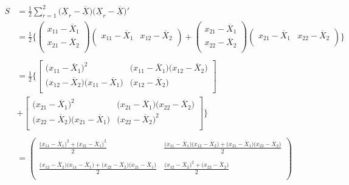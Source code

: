 \documentclass[11pt,a4paper]{article}
\theoremstyle{definition}
\begin{document}
\begin{align*}
S & = \frac{1}{2}\sum^2_{r=1}\big(\underline{X}_r-\underline{\overline{X}}\big)\big(\underline{X}_r-\overline{\underline{X}}\big)'\\
  & = \frac{1}{2}\Bigg\{
\begin{pmatrix}
x_{11}-\overline{X}_1\\ x_{21}-\overline{X}_2\\
\end{pmatrix}  
\begin{pmatrix}
x_{11}-\overline{X}_1 & x_{12}-\overline{X}_2\\
\end{pmatrix}
+
\begin{pmatrix}
x_{21}-\overline{X}_1\\ x_{22}-\overline{X}_2\\
\end{pmatrix}
\begin{pmatrix}
x_{21}-\overline{X}_1 & x_{22}-\overline{X}_2\\
\end{pmatrix}
  \Bigg\}\\\\
  & = \frac{1}{2}\Bigg\{
\begin{bmatrix}
\big(x_{11}-\overline{X}_1\big)^2 & \big(x_{11}-\overline{X}_1\big)\big(x_{12}-\overline{X}_2\big)\\
\big(x_{12}-\overline{X}_2\big)\big(x_{11}-\overline{X}_1\big) & \big(x_{12}-\overline{X}_2\big)\\
\end{bmatrix}\\
& +
\begin{bmatrix}
\big(x_{21}-\overline{X}_1\big)^2 & \big(x_{21}-\overline{X}_1\big)\big(x_{22}-\overline{X}_2\big)\\
\big(x_{22}-\overline{X}_2\big)\big(x_{21}-\overline{X}_1\big) & \big(x_{22}-\overline{X}_2\big)^2\\
\end{bmatrix}
\Bigg\}\\\\
& = 
\begin{pmatrix}
\frac{\big(x_{11}-\overline{X}_1\big)^2+\big(x_{21}-\overline{X}_1\big)^2}{2} & \frac{\big(x_{11}-\overline{X}_1\big)\big(x_{12}-\overline{X}_2\big)+\big(x_{21}-\overline{X}_1\big)\big(x_{22}-\overline{X}_2\big)}{2}\\\\
\frac{\big(x_{12}-\overline{X}_2\big)\big(x_{11}-\overline{X}_1\big)+\big(x_{22}-\overline{X}_2\big)\big(x_{21}-\overline{X}_1\big)}{2} & \frac{\big(x_{12}-\overline{X}_2\big)^2+\big(x_{22}-\overline{X}_2\big)}{2}\\
\end{pmatrix}
\end{align*}
\end{document}
